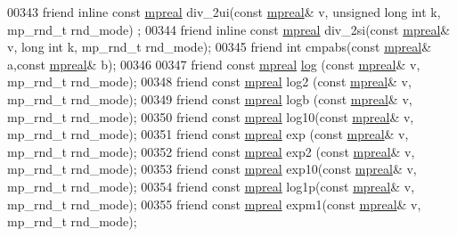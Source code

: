\begin{DoxyCode}
00343     \textcolor{keyword}{friend} \textcolor{keyword}{inline} \textcolor{keyword}{const} \hyperlink{classmpfr_1_1mpreal}{mpreal} div\_2ui(\textcolor{keyword}{const} \hyperlink{classmpfr_1_1mpreal}{mpreal}& v, \textcolor{keywordtype}{unsigned} \textcolor{keywordtype}{long} \textcolor{keywordtype}{int} k, mp\_rnd\_t rnd\_mode)
      ;
00344     \textcolor{keyword}{friend} \textcolor{keyword}{inline} \textcolor{keyword}{const} \hyperlink{classmpfr_1_1mpreal}{mpreal} div\_2si(\textcolor{keyword}{const} \hyperlink{classmpfr_1_1mpreal}{mpreal}& v, \textcolor{keywordtype}{long} \textcolor{keywordtype}{int} k, mp\_rnd\_t rnd\_mode);
00345     \textcolor{keyword}{friend} \textcolor{keywordtype}{int} cmpabs(\textcolor{keyword}{const} \hyperlink{classmpfr_1_1mpreal}{mpreal}& a,\textcolor{keyword}{const} \hyperlink{classmpfr_1_1mpreal}{mpreal}& b);
00346 
00347     \textcolor{keyword}{friend} \textcolor{keyword}{const} \hyperlink{classmpfr_1_1mpreal}{mpreal} \hyperlink{structlog}{log}  (\textcolor{keyword}{const} \hyperlink{classmpfr_1_1mpreal}{mpreal}& v, mp\_rnd\_t rnd\_mode);
00348     \textcolor{keyword}{friend} \textcolor{keyword}{const} \hyperlink{classmpfr_1_1mpreal}{mpreal} log2 (\textcolor{keyword}{const} \hyperlink{classmpfr_1_1mpreal}{mpreal}& v, mp\_rnd\_t rnd\_mode);
00349     \textcolor{keyword}{friend} \textcolor{keyword}{const} \hyperlink{classmpfr_1_1mpreal}{mpreal} logb (\textcolor{keyword}{const} \hyperlink{classmpfr_1_1mpreal}{mpreal}& v, mp\_rnd\_t rnd\_mode);
00350     \textcolor{keyword}{friend} \textcolor{keyword}{const} \hyperlink{classmpfr_1_1mpreal}{mpreal} log10(\textcolor{keyword}{const} \hyperlink{classmpfr_1_1mpreal}{mpreal}& v, mp\_rnd\_t rnd\_mode);
00351     \textcolor{keyword}{friend} \textcolor{keyword}{const} \hyperlink{classmpfr_1_1mpreal}{mpreal} exp  (\textcolor{keyword}{const} \hyperlink{classmpfr_1_1mpreal}{mpreal}& v, mp\_rnd\_t rnd\_mode);
00352     \textcolor{keyword}{friend} \textcolor{keyword}{const} \hyperlink{classmpfr_1_1mpreal}{mpreal} exp2 (\textcolor{keyword}{const} \hyperlink{classmpfr_1_1mpreal}{mpreal}& v, mp\_rnd\_t rnd\_mode);
00353     \textcolor{keyword}{friend} \textcolor{keyword}{const} \hyperlink{classmpfr_1_1mpreal}{mpreal} exp10(\textcolor{keyword}{const} \hyperlink{classmpfr_1_1mpreal}{mpreal}& v, mp\_rnd\_t rnd\_mode);
00354     \textcolor{keyword}{friend} \textcolor{keyword}{const} \hyperlink{classmpfr_1_1mpreal}{mpreal} log1p(\textcolor{keyword}{const} \hyperlink{classmpfr_1_1mpreal}{mpreal}& v, mp\_rnd\_t rnd\_mode);
00355     \textcolor{keyword}{friend} \textcolor{keyword}{const} \hyperlink{classmpfr_1_1mpreal}{mpreal} expm1(\textcolor{keyword}{const} \hyperlink{classmpfr_1_1mpreal}{mpreal}& v, mp\_rnd\_t rnd\_mode);

\end{DoxyCode}
